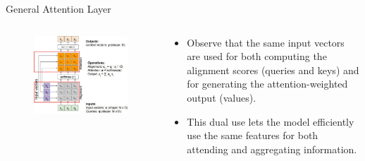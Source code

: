 \begin{frame}[allowframebreaks]{General Attention Layer}
    \begin{columns}
    \begin{column}{0.6\textwidth}
        \begin{figure}
            \flushleft
            \includegraphics[width=\linewidth,height=\textheight,keepaspectratio]{images/transformers/slide_38_1_img.jpg}
        \end{figure}
    \end{column}
    \begin{column}{0.4\textwidth}
        \begin{itemize}
            \item Observe that the same input vectors are used for both computing the alignment scores (queries and keys) and for generating the attention-weighted output (values).
            \item This dual use lets the model efficiently use the same features for both attending and aggregating information.
        \end{itemize}
    \end{column}
    \end{columns}

    \framebreak


\end{frame}
